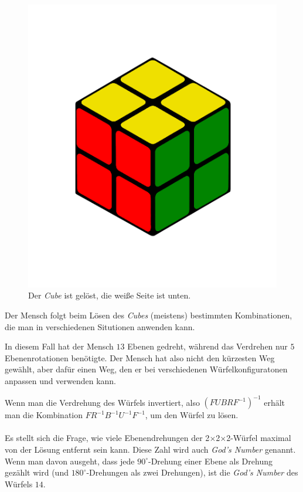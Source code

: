 \documentclass[12pt,a4paper, usenames, dvipsnames]{article}
\newcommand{\Ttwo}{2$\times$2$\times$2-}
\begin{document}
\begin{figure}[H]
\centering
\includegraphics[scale=0.12]{menschSchritt5.png}
\caption[Lösung von Mensch: Schritt 5]{Der \textit{Cube} ist gelöst, die weiße Seite ist unten.}
\label{23}
\end{figure}

Der Mensch folgt beim Lösen des \textit{Cubes} (meistens) bestimmten Kombinationen, die man in verschiedenen Situtionen anwenden kann.  

In diesem Fall hat der Mensch $13$ Ebenen gedreht, während das Verdrehen nur $5$ Ebenenrotationen benötigte. Der Mensch hat also nicht den kürzesten Weg gewählt, aber dafür einen Weg, den er bei verschiedenen Würfelkonfiguratonen anpassen und verwenden kann. 

Wenn man die Verdrehung des Würfels invertiert, also $(FUBRF^{-1})^{-1}$ erhält man die Kombination $FR^{-1}B^{-1}U^{-1}F^{-1}$, um den Würfel zu lösen.
\\
\\
Es stellt sich die Frage, wie viele Ebenendrehungen der \Ttwo Würfel maximal von der Lösung entfernt sein kann. Diese Zahl wird auch \textit{God's Number} genannt. \\
Wenn man davon ausgeht, dass jede $90^\circ$-Drehung einer Ebene als Drehung gezählt wird (und $180^\circ$-Drehungen als zwei Drehungen), ist die \textit{God's Number} des Würfels $14$. \cite{DJ} 

%
%
%
%
%
%
%
%
%
%
%
%
%
%
%
%
%
%
%
%
\newpage



\listoffigures

\newpage


\listoftables

\newpage


\printbibliography
\end{document}
